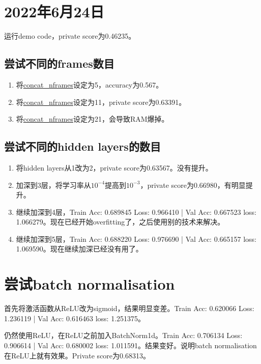 \documentclass{article}
\begin{document}
\begin{CJK}{UTF8}{gbsn}

\section{2022年6月24日}

运行demo code，private score为0.46235。

\subsection{尝试不同的frames数目}

\begin{enumerate}
	\item 将\url{concat_nframes}设定为5，accuracy为0.567。
	\item 将\url{concat_nframes}设定为11，private score为0.63391。
	\item 将\url{concat_nframes}设定为21，会导致RAM爆掉。
\end{enumerate}

\subsection{尝试不同的hidden layers的数目}

\begin{enumerate}
	\item 将hidden layers从1改为2，private score为0.63567。没有提升。
	\item 加深到3层，将学习率从$10^{-4}$提高到$10^{-3}$，private score为0.66980，有明显提升。
	\item 继续加深到4层，Train Acc: 0.689845 Loss: 0.966410 | Val Acc: 0.667523 loss: 1.066279。现在已经开始overfitting了，之后使用别的技术来解决。
	\item 继续加深到5层，Train Acc: 0.688220 Loss: 0.976690 | Val Acc: 0.665157 loss: 1.069590。现在继续加深已经没有用了。
\end{enumerate}

\section{尝试batch normalisation}

首先将激活函数从ReLU改为sigmoid，结果明显变差。Train Acc: 0.620066 Loss: 1.236119 | Val Acc: 0.616463 loss: 1.251375。

仍然使用ReLU，在ReLU之前加入BatchNorm1d。Train Acc: 0.706134 Loss: 0.906614 | Val Acc: 0.680002 loss: 1.011591。结果变好。说明batch normalisation在ReLU上就有效果。Private score为0.68313。


\end{CJK}
\end{document}
